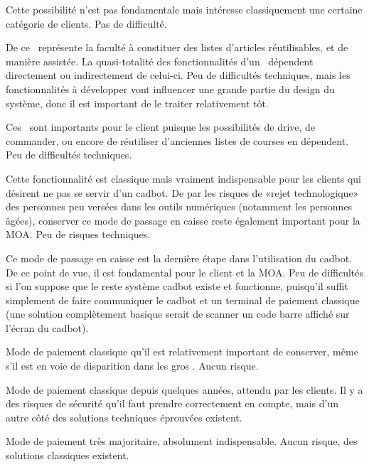 \startnote
{} Cette possibilité n'est pas fondamentale mais intéresse classiquement une certaine catégorie de clients.
 Pas de difficulté.
\stopnote

\startnote
{} De ce \cu\ représente la faculté à constituer des listes d'articles réutilisables, et de manière assistée.
La quasi-totalité des fonctionnalités d'un \fm\ dépendent directement ou indirectement de celui-ci.
 Peu de difficultés techniques, mais les fonctionnalités à développer vont influencer une grande partie du design du système, donc il est important de le traiter relativement tôt.
\stopnote

\startnote
{} Ces \cu\ sont importants pour le client puisque les possibilités de drive, de commander, ou encore de réutiliser d'anciennes listes de courses en dépendent.
 Peu de difficultés techniques.
\stopnote

\startnote
{} Cette fonctionnalité est classique mais vraiment indispensable pour les clients qui désirent ne pas se servir d'un cadbot.
De par les risques de «rejet technologique» des personnes peu versées dans les outils numériques (notamment les personnes âgées), conserver ce mode de passage en caisse reste également important pour la MOA.
 Peu de risques techniques.
\stopnote

\startnote
{} Ce mode de passage en caisse est la dernière étape dans l'utilisation du cadbot.
De ce point de vue, il est fondamental pour le client et la MOA.
 Peu de difficultés si l'on suppose que le reste système cadbot existe et fonctionne, puisqu'il suffit simplement de faire communiquer le cadbot et un terminal de paiement classique (une solution complètement basique serait de scanner un code barre affiché sur l'écran du cadbot).
\stopnote

\startnote
{} Mode de paiement classique qu'il est relativement important de conserver, même s'il est en voie de disparition dans les gros \fm.
 Aucun risque.
\stopnote

\startnote
{} Mode de paiement classique depuis quelques années, attendu par les clients.
 Il y a des risques de sécurité qu'il faut prendre correctement en compte, mais d'un autre côté des solutions techniques éprouvées existent.
\stopnote

\startnote
{} Mode de paiement très majoritaire, absolument indispensable.
 Aucun risque, des solutions classiques existent.
\stopnote

